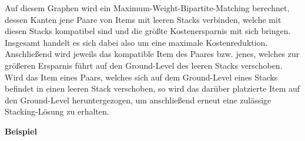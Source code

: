 Auf diesem Graphen wird ein Maximum-Weight-Bipartite-Matching berechnet, dessen Kanten jene Paare von Items
mit leeren Stacks verbinden, welche mit diesen Stacks kompatibel sind und die größte Kostenersparnis mit sich bringen.
Insgesamt handelt es sich dabei also um eine maximale Kostenreduktion.
Anschließend wird jeweils das kompatible Item des Paares bzw. jenes, welches zur größeren Ersparnis führt auf
den Ground-Level des leeren Stacks verschoben.
Wird das Item eines Paars, welches sich auf dem Ground-Level eines Stacks befindet in einen
leeren Stack verschoben, so wird das darüber platzierte Item auf den Ground-Level heruntergezogen,
um anschließend erneut eine zulässige Stacking-Lösung zu erhalten.

\vfill

\pagebreak

\textbf{Beispiel}

